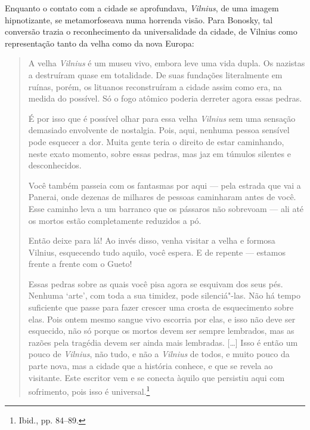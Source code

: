 Enquanto o contato com a cidade se aprofundava, \textit{Vilnius}, de uma imagem
hipnotizante, se metamorfoseava numa horrenda visão. Para Bonosky, tal
conversão trazia o reconhecimento da universalidade da cidade, de
Vilnius como representação tanto da velha como da nova Europa:

\begin{quote}
A velha \textit{Vilnius} é um museu vivo, embora leve uma vida dupla. Os nazistas
a destruíram quase em totalidade. De suas fundações literalmente em
ruínas, porém, os lituanos reconstruíram a cidade assim como era, na
medida do possível. Só o fogo atômico poderia derreter agora essas
pedras.

É por isso que é possível olhar para essa velha \textit{Vilnius} sem uma sensação
demasiado envolvente de nostalgia. Pois, aqui, nenhuma pessoa sensível
pode esquecer a dor. Muita gente teria o direito de estar caminhando,
neste exato momento, sobre essas pedras, mas jaz em túmulos silentes e
desconhecidos.

Você também passeia com os fantasmas por aqui --- pela estrada que vai a
Panerai, onde dezenas de milhares de pessoas caminharam antes de você.
Esse caminho leva a um barranco que os pássaros não sobrevoam --- ali até
os mortos estão completamente reduzidos a pó.

Então deixe para lá! Ao invés disso, venha visitar a velha e formosa
Vilnius, esquecendo tudo aquilo, você espera. E de repente --- estamos
frente a frente com o Gueto!

Essas pedras sobre as quais você pisa agora se esquivam dos seus pés.
Nenhuma `arte', com toda a sua timidez, pode silenciá"-las. Não há tempo
suficiente que passe para fazer crescer uma crosta de esquecimento sobre
elas. Pois ontem mesmo sangue vivo escorria por elas, e isso não deve
ser esquecido, não só porque os mortos devem ser sempre lembrados, mas
as razões pela tragédia devem ser ainda mais lembradas. [\ldots{}] Isso é
então um pouco de \textit{Vilnius}, não tudo, e não a \textit{Vilnius} de todos, e muito
pouco da parte nova, mas a cidade que a história conhece, e que se
revela ao visitante. Este escritor vem e se conecta àquilo que persistiu
aqui com sofrimento, pois isso é universal.\footnote{Ibid., pp. 84--89.}
\end{quote}

